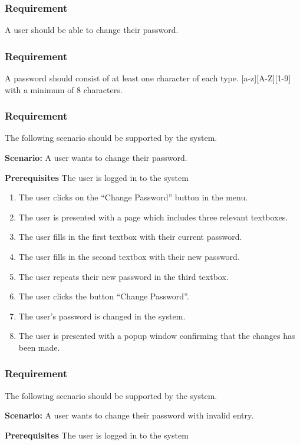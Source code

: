 \documentclass{article}
\begin{document}
\subsubsection{Requirement}
A user should be able to change their password.
\subsubsection{Requirement}
A password should consist of at least one character of each type. [a-z][A-Z][1-9] with a minimum of 8 characters.

\subsubsection{Requirement}
The following scenario should be supported by the system.

\textbf{Scenario:} A user wants to change their password.

\textbf{Prerequisites} The user is logged in to the system

\begin{enumerate}
    \item The user clicks on the “Change Password” button in the menu.
    \item The user is presented with a page which includes three relevant textboxes.
    \item The user fills in the first textbox with their current password.
    \item The user fills in the second textbox with their new password.
    \item The user repeats their new password in the third textbox.
    \item The user clicks the button “Change Password”.
    \item The user's password is changed in the system.
    \item The user is presented with a popup window confirming that the changes has been made.
\end{enumerate}



\subsubsection{Requirement}
The following scenario should be supported by the system.

\textbf{Scenario:} A user wants to change their password with invalid entry.

\textbf{Prerequisites} The user is logged in to the system
\end{document}
